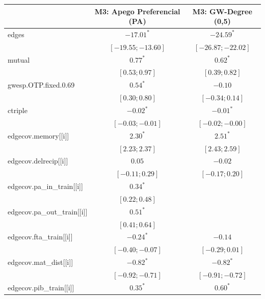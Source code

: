 
\begin{table}
\begin{center}
\begin{tabular}{l c c}
\hline
 & M3: Apego Preferencial (PA) & M3: GW-Degree (0,5) \\
\hline
edges                       & $-17.01^{*}$        & $-24.59^{*}$        \\
                            & $ [-19.55; -13.60]$ & $ [-26.87; -22.02]$ \\
mutual                      & $0.77^{*}$          & $0.62^{*}$          \\
                            & $ [  0.53;   0.97]$ & $ [  0.39;   0.82]$ \\
gwesp.OTP.fixed.0.69        & $0.54^{*}$          & $-0.10$             \\
                            & $ [  0.30;   0.80]$ & $ [ -0.34;   0.14]$ \\
ctriple                     & $-0.02^{*}$         & $-0.01^{*}$         \\
                            & $ [ -0.03;  -0.01]$ & $ [ -0.02;  -0.00]$ \\
edgecov.memory[[i]]         & $2.30^{*}$          & $2.51^{*}$          \\
                            & $ [  2.23;   2.37]$ & $ [  2.43;   2.59]$ \\
edgecov.delrecip[[i]]       & $0.05$              & $-0.02$             \\
                            & $ [ -0.11;   0.29]$ & $ [ -0.17;   0.20]$ \\
edgecov.pa\_in\_train[[i]]  & $0.34^{*}$          &                     \\
                            & $ [  0.22;   0.48]$ &                     \\
edgecov.pa\_out\_train[[i]] & $0.51^{*}$          &                     \\
                            & $ [  0.41;   0.64]$ &                     \\
edgecov.fta\_train[[i]]     & $-0.24^{*}$         & $-0.14$             \\
                            & $ [ -0.40;  -0.07]$ & $ [ -0.29;   0.01]$ \\
edgecov.mat\_dist[[i]]      & $-0.82^{*}$         & $-0.82^{*}$         \\
                            & $ [ -0.92;  -0.71]$ & $ [ -0.91;  -0.72]$ \\
edgecov.pib\_train[[i]]     & $0.35^{*}$          & $0.60^{*}$          \\

\end{tabular}
\end{center}
\end{table}
